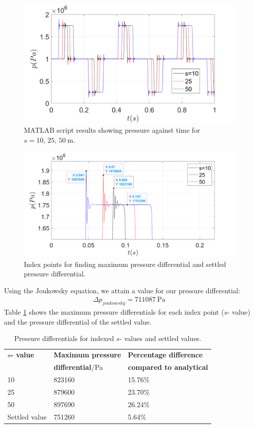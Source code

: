 \begin{figure}[H]
    \centering
    \includegraphics[width = 0.9 \textwidth]{img/fig1.png}
    \caption{MATLAB script results showing pressure against time for $s=10,\,25,\,\SI{50}{\meter}$.}
    \label{pressure1}
\end{figure}
\begin{figure}[H]
    \centering
    \includegraphics[width = 0.9 \textwidth]{img/fig3.png}
    \caption{Index points for finding maximum pressure differential and settled pressure differential.}
    \label{pressure2}
\end{figure}
Using the Joukowsky equation, we attain a value for our pressure differential:
\begin{gather}
    \Delta p_{joukowsky} = \SI{711087}{\pascal}
\end{gather}
Table \ref{matlabResults} shows the maximum pressure differentials for each index point ($s$- value) and the pressure differential of the settled value.
\begin{table}[H]
    \centering
    \begin{tabular}{@{}lll@{}}
        \toprule
        \textbf{$s$- value} & \textbf{Maximum pressure } & \textbf{Percentage difference}\\
        & \textbf{differential}/\si{\pascal} & \textbf{compared to analytical}\\
        \midrule
        10 & 823160 & 15.76\%\\
        25 & 879600 & 23.70\%\\
        50 & 897690 & 26.24\%\\
        Settled value & 751260 & 5.64\%\\
        \bottomrule
    \end{tabular}
    \caption{Pressure differentials for indexed $s$- values and settled values.}
    \label{matlabResults}
\end{table}
